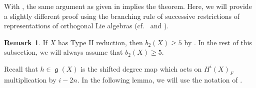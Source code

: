 \documentclass[12pt,reqno]{amsart}
\theoremstyle{definition}
\newtheorem{rem}[thm]{Remark}
\renewcommand\ge{\mathop{\mathfrak{g}}\nolimits}
\numberwithin{equation}{section}
\begin{document}
With , the same argument as given in \cite{GKLR} implies the theorem.
Here, we will provide a slightly different proof using the branching rule of successive restrictions of representations of orthogonal Lie algebras (cf.~ \cite[Section 25.3]{FultonHarris} and \cite[Appendix B.2]{GKLR}).

\begin{rem}
    If $X$ has Type II reduction, then $b_2(X) \geq 5$ by .
    In the rest of this subsection, we will always assume that $b_2(X) \geq 5$.
\end{rem}

Recall that $h \in \ge(X)$ is the shifted degree map which acts on $H^i(X)_F$ multiplication by $i-2n$.
In the following lemma, we will use the notation of .
\end{document}
